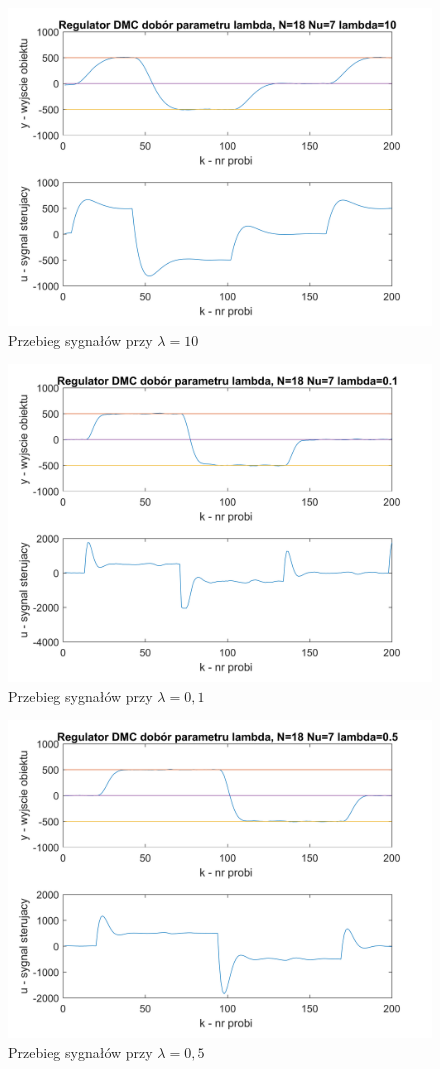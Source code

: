 \documentclass[a4paper, 10pt]{article}
\begin{document}
\begin{figure}[H]
	\centering
	\includegraphics[width=0.9\linewidth]{DMC18710}
	\caption{Przebieg sygnałów przy $\lambda=10$}
	\label{fig:DMC18710}
\end{figure}
\begin{figure}[H]
	\centering
	\includegraphics[width=0.9\linewidth]{DMC18710000000}
	\caption{Przebieg sygnałów przy $\lambda=0,1$}
	\label{fig:DMC18710000000}
\end{figure}
\begin{figure}[H]
	\centering
	\includegraphics[width=0.9\linewidth]{DMC18750000000}
	\caption{Przebieg sygnałów przy $\lambda=0,5$}
	\label{fig:DMC18750000000}
\end{figure}
\end{document}
